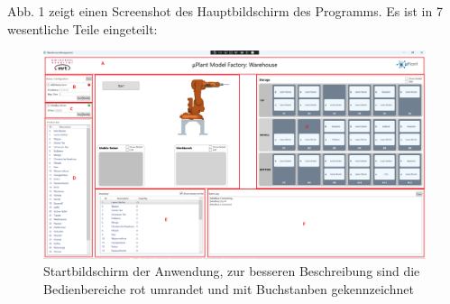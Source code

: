         Abb. 1 zeigt einen Screenshot des Hauptbildschirm des Programms. Es ist in 7 wesentliche Teile eingeteilt:
    \begin{figure}[ht]
        \label{fig:figure}
        \includegraphics[width = \textwidth ]{Bilder/LV_Startbildschirm}
        \caption[Ansicht des Startbildschirms]
        {\small Startbildschirm der Anwendung, zur besseren Beschreibung sind die Bedienbereiche rot umrandet und mit
        Buchstanben gekennzeichnet}
        \centering
    \end{figure}

